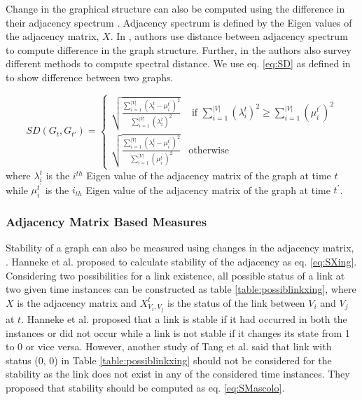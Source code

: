 \documentclass[preprint, twocolumn,5p]{elsarticle}
\begin{document}
        Change in the graphical structure can also be computed using the difference in their adjacency spectrum \cite{Jurman2010}. Adjacency spectrum is defined by the Eigen values of the adjacency matrix, $X$. In \cite{Jurman2010}, authors use distance between adjacency spectrum to compute difference in the graph structure. Further, in \cite{Jurman2010} the authors also survey different methods to compute spectral distance. We use eq. \ref{eq:SD} as defined in \cite{Pincombe2007,Jurman2010} to show difference between two graphs.

        \begin {equation}\label{eq:SD}
        SD(G_{t},G_{t'})=\begin{cases}
                        \sqrt{\frac{\sum \limits _{i=1}^{|V|}(\lambda_{i}^{t}-\mu_{i}^{t^{'}})^2}{\sum \limits _{i=1}^{|V|}(\lambda_{i}^{t})^2}} & \text{ if } \sum \limits _{i=1}^{|V|}(\lambda_{i}^{t})^2\geq \sum \limits _{i=1}^{|V|}(\mu_{i}^{t^{'}})^2 \\
                        \sqrt{\frac{\sum \limits _{i=1}^{|V|}(\lambda_{i}^{t}-\mu_{i}^{t^{'}})^2}{\sum \limits _{i=1}^{|V|}(\mu_{i}^{t^{'}})^2}} & \text{otherwise}
                        \end{cases}
        \end{equation}
        where $\lambda_{i}^{t}$ is the $i^{th}$ Eigen value of the adjacency matrix of the graph at time $t$ while $\mu_{i}^{t^{'}}$ is the $i_{th}$ Eigen value of the adjacency matrix of the graph at time $t^{'}$.

        \subsubsection{Adjacency Matrix Based Measures}\label{subsubsec:adjacencybased}

        Stability of a graph can also be measured using changes in the adjacency matrix, \cite{Hanneke2010,Tang2010}. Hanneke et al. \cite{Hanneke2010} proposed to calculate stability of the adjacency as eq. \ref{eq:SXing}. Considering two possibilities for a link existence, all possible status of a link at two given time instances can be constructed as table \ref{table:possiblinkxing}, where $X$ is the adjacency matrix and $X_{V_{i},V_{j}}^{t}$ is the status of the link between $V_{i}$ and $V_{j}$ at $t$. Hanneke et al. proposed that a link is stable if it had occurred in both the instances or did not occur while a link is not stable if it changes its state from 1 to 0 or vice versa. However, another study of Tang et al. \cite{Tang2010} said that link with status (0, 0)  in Table \ref{table:possiblinkxing} should not be considered for the stability as the link does not exist in any of the considered time instances. They proposed that stability should be computed as eq. \ref{eq:SMascolo}.
\end{document}
